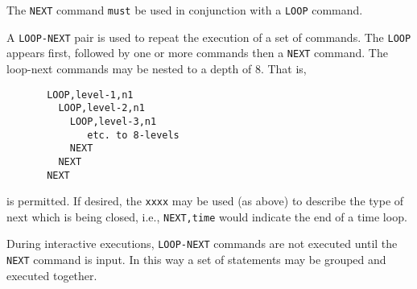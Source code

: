 \headb

The {\tt NEXT} command {\tt must} be used in conjunction
with a {\tt LOOP} command.

A {\tt LOOP-NEXT} pair is used to
repeat the execution of a set of commands.  The {\tt LOOP}
appears first, followed by one or more commands then
a {\tt NEXT} command.  The loop-next commands may be
nested to a depth of 8.  That is,
\begin{verbatim}
       LOOP,level-1,n1
         LOOP,level-2,n1
           LOOP,level-3,n1
              etc. to 8-levels
           NEXT
         NEXT
       NEXT
\end{verbatim}
is permitted.
If desired, the {\tt xxxx} may be used (as above)
to describe the type of next which is being closed, i.e.,
{\tt NEXT,time} would indicate the end of a time loop.

During interactive executions, {\tt LOOP-NEXT} commands
are not executed until the {\tt NEXT} command is input.
In this way a set of statements may be grouped and executed together.
\vfill\eject

